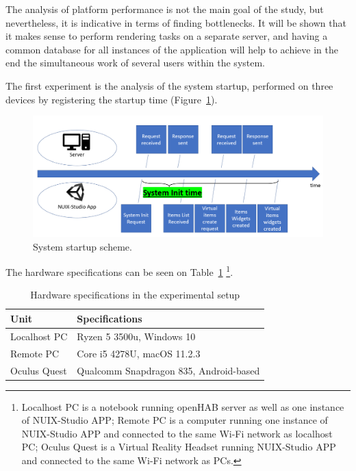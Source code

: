 The analysis of platform performance is not the main goal of the study, but nevertheless, it is indicative in terms of finding bottlenecks. It will be shown that it makes sense to perform rendering tasks on a separate server, and having a common database for all instances of the application will help to achieve in the end the simultaneous work of several users within the system.

The first experiment is the analysis of the system startup, performed on three devices by registering the startup time (Figure~\ref{fig:SystemStartupScheme-figure}).

\begin{figure}
  \centering
  \includegraphics[width = 0.9 \linewidth]{figures/SystemStartupScheme.png}
  \caption{System startup scheme.}
  \label{fig:SystemStartupScheme-figure}
\end{figure}

The hardware specifications can be seen on Table~\ref{tab:hardware-specifications-table} \footnote{Localhost PC is a notebook running openHAB server as well as one instance of NUIX-Studio APP; Remote PC is a computer running one instance of NUIX-Studio APP and connected to the same Wi-Fi network as localhost PC; Oculus Quest is a Virtual Reality Headset running NUIX-Studio APP and connected to the same Wi-Fi network as PCs.}.

\begin{table}
  \centering
  \begin{threeparttable}[c]
    \caption{Hardware specifications in the experimental setup}
    \label{tab:hardware-specifications-table}
    \begin{tabular}{ll}
      \toprule
      Unit    &         Specifications                 \\
      \midrule
      Localhost PC & Ryzen 5 3500u, Windows 10 \\
      Remote PC & Core i5 4278U, macOS 11.2.3    \\
      Oculus Quest        & Qualcomm Snapdragon 835, Android-based            \\
      \bottomrule
    \end{tabular}
  \end{threeparttable}
\end{table}

